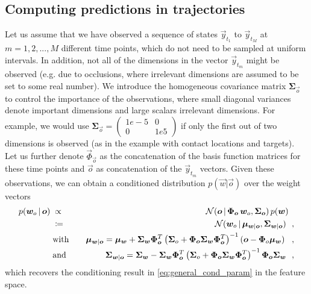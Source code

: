 \subsection*{Computing predictions in trajectories}
Let us assume that we have observed a sequence of states $\vec y_{t_1}$ to $\vec y_{t_M}$ at $m=1,2, ..., M$ different time points, 
which do not need to be sampled at uniform intervals. In addition, not all of the dimensions in the vector 
$\vec y_{t_m}$ might be observed (e.g. due to occlusions, where irrelevant dimensions are assumed to be set to some real number). 
We introduce the homogeneous covariance matrix $\boldsymbol{\Sigma}_{\vec o}$ to control the importance of the observations, 
where small diagonal variances denote important dimensions and large scalars irrelevant dimensions. 
For example, we would use $\boldsymbol{\Sigma}_{\vec o} = \left( \begin{smallmatrix} 1e-5&0\\ 0&1e5 \end{smallmatrix} \right)$ 
if only the first out of two dimensions is observed (as in the example with contact locations and targets). 
Let us further denote $\vec \Phi_{\vec o}$ as the concatenation of the basis function matrices for these time points 
and $\vec o$ as concatenation of the $\vec y_{t_m}$ vectors. 
Given these observations, we can obtain a conditioned distribution $p(\vec w| \vec o)$ over the weight vectors 
\begin{eqnarray*}
    p(\boldsymbol{w}_o \, | \, \boldsymbol{o}) \;& \propto &\; \mathcal{N}(\boldsymbol{o} \, | \, \boldsymbol{\Phi}_{\boldsymbol{o}} \, \boldsymbol{w}_o, \boldsymbol{\Sigma}_{\boldsymbol{o}}) \, p(\boldsymbol{w}) ~~ \\
     \;& \coloneqq &\; \mathcal{N}(\boldsymbol{w}_o \, | \, \boldsymbol{\mu}_{\boldsymbol{w}| \boldsymbol{o}}, \boldsymbol{\Sigma}_{\boldsymbol{w}|\boldsymbol{o}}) ~~, \\
    & \text{with} & ~~~ \boldsymbol{\mu}_{\boldsymbol{w}| \boldsymbol{o}}  =  \boldsymbol{\mu}_{\boldsymbol{w}} + 
      \boldsymbol{\Sigma}_{\boldsymbol{w}}\boldsymbol{\Phi}_{\boldsymbol{o}}^T\left(\boldsymbol{\Sigma}_o + 
      \boldsymbol{\Phi}_{\boldsymbol{o}}\boldsymbol{\Sigma}_{\boldsymbol{w}}\boldsymbol{\Phi}_{\boldsymbol{o}}^T\right)^{-1}\left(\boldsymbol{o} -\boldsymbol{\Phi}_{o}\boldsymbol{\mu}_{\boldsymbol{w}}\right) ~~,  \\
    & \text{and} & ~~~ \boldsymbol{\Sigma}_{\boldsymbol{w}|\boldsymbol{o}} =  \boldsymbol{\Sigma}_{\boldsymbol{w}}-
      \boldsymbol{\Sigma}_{\boldsymbol{w}}\boldsymbol{\Phi}_{\boldsymbol{o}}^T\left(\boldsymbol{\Sigma}_o 
      +\boldsymbol{\Phi}_{\boldsymbol{o}}\boldsymbol{\Sigma}_{\boldsymbol{w}}\boldsymbol{\Phi}_{\boldsymbol{o}}^T\right)^{-1}\boldsymbol{\Phi}_{\boldsymbol{o}} \boldsymbol{\Sigma}_{\boldsymbol{w}} ~~, 
\end{eqnarray*}
which recovers the conditioning result in \eqref{eq:general_cond_param} in the feature space. 

